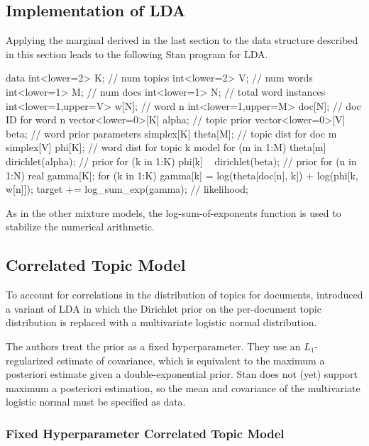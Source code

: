 \subsection{Implementation of LDA}


Applying the marginal derived in the last section to the data
structure described in this section leads to the following Stan
program for LDA.
%
\begin{stancode}
data {
  int<lower=2> K;               // num topics
  int<lower=2> V;               // num words
  int<lower=1> M;               // num docs
  int<lower=1> N;               // total word instances
  int<lower=1,upper=V> w[N];    // word n
  int<lower=1,upper=M> doc[N];  // doc ID for word n
  vector<lower=0>[K] alpha;     // topic prior
  vector<lower=0>[V] beta;      // word prior
}
parameters {
  simplex[K] theta[M];   // topic dist for doc m
  simplex[V] phi[K];     // word dist for topic k
}
model {
  for (m in 1:M)
    theta[m] ~ dirichlet(alpha);  // prior
  for (k in 1:K)
    phi[k] ~ dirichlet(beta);     // prior
  for (n in 1:N) {
    real gamma[K];
    for (k in 1:K)
      gamma[k] = log(theta[doc[n], k]) + log(phi[k, w[n]]);
    target += log_sum_exp(gamma);  // likelihood;
  }
}
\end{stancode}
%
As in the other mixture models, the log-sum-of-exponents function is
used to stabilize the numerical arithmetic.

\subsection{Correlated Topic Model}

To account for correlations in the distribution of topics for
documents, \citep{BleiLafferty:2007} introduced a variant of LDA in
which the Dirichlet prior on the per-document topic distribution is
replaced with a multivariate logistic normal distribution.

The authors treat the prior as a fixed hyperparameter.  They use an
$L_1$-regularized estimate of covariance, which is equivalent to the
maximum a posteriori estimate given a double-exponential prior.  Stan
does not (yet) support maximum a posteriori estimation, so the mean and
covariance of the multivariate logistic normal must be specified as
data.

\subsubsection{Fixed Hyperparameter Correlated Topic Model}

